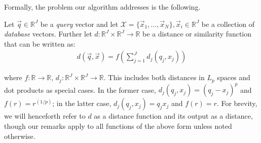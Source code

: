 \begin{table*}[t]
\begin{tabularx}{\linewidth}{X|YYYY}
\bottomrule
\end{tabularx}
\end{table*}

Formally, the problem our algorithm addresses is the following.

Let $\vec{q} \in \mathbb{R}^J$ be a \textit{query} vector and let $\mathcal{X} = \{\vec{x}_1,\ldots,\vec{x}_N\}, \vec{x}_i \in \mathbb{R}^J$ be a collection of \textit{database} vectors. Further let $d: \mathbb{R}^J \times \mathbb{R}^J \rightarrow \mathbb{R}$ be a distance or similarity function that can be written as:
\begin{align} \label{eq:distFuncForm}
        d(\vec{q}, \vec{x}) = f(\sum_{j=1}^J d_j(q_j, x_j))
\end{align}


where $f: \mathbb{R} \rightarrow \mathbb{R}$, $d_j: \mathbb{R}^J \times \mathbb{R}^J \rightarrow \mathbb{R}$. This includes both distances in $L_p$ spaces and dot products as special cases. In the former case, $d_j(q_j, x_j) = (q_j - x_j)^p$ and $f(r) = r^{(1/p)}$; in the latter case, $d_j(q_j, x_j) = q_j x_j$ and $f(r) = r$. For brevity, we will henceforth refer to $d$ as a distance function and its output as a distance, though our remarks apply to all functions of the above form unless noted otherwise.

